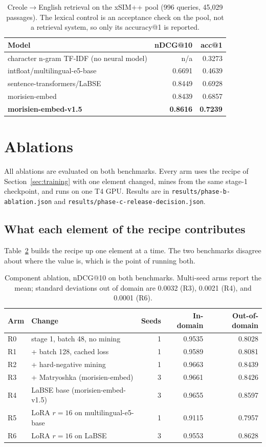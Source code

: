 \documentclass[11pt]{article}
\begin{document}
\begin{table}[h]
\centering
\small
\begin{tabular}{lrr}
\toprule
Model & nDCG@10 & acc@1 \\
\midrule
character n-gram TF-IDF (no neural model) & n/a & 0.3273 \\
intfloat/multilingual-e5-base & 0.6691 & 0.4639 \\
sentence-transformers/LaBSE & 0.8449 & 0.6928 \\
morisien-embed & 0.8439 & 0.6857 \\
\textbf{morisien-embed-v1.5} & \textbf{0.8616} & \textbf{0.7239} \\
\bottomrule
\end{tabular}
\caption{Creole$\rightarrow$English retrieval on the xSIM++ pool (996 queries, 45{,}029 passages).
The lexical control is an acceptance check on the pool, not a retrieval system, so only its
accuracy@1 is reported.}
\label{tab:ood}
\end{table}

\section{Ablations}

All ablations are evaluated on both benchmarks. Every arm uses the recipe of
Section~\ref{sec:training} with one element changed, mines from the same stage-1 checkpoint, and runs on
one T4 GPU. Results are in \texttt{results/phase-b-ablation.json} and
\texttt{results/phase-c-release-decision.json}.

\subsection{What each element of the recipe contributes}

Table~\ref{tab:ablation} builds the recipe up one element at a time. The two benchmarks disagree
about where the value is, which is the point of running both.

\begin{table}[h]
\centering
\small
\begin{tabular}{llrrr}
\toprule
Arm & Change & Seeds & In-domain & Out-of-domain \\
\midrule
R0 & stage 1, batch 48, no mining & 1 & 0.9535 & 0.8028 \\
R1 & + batch 128, cached loss & 1 & 0.9589 & 0.8081 \\
R2 & + hard-negative mining & 1 & 0.9663 & 0.8439 \\
R3 & + Matryoshka (morisien-embed) & 3 & 0.9661 & 0.8426 \\
R4 & LaBSE base (morisien-embed-v1.5) & 3 & 0.9655 & 0.8597 \\
R5 & LoRA $r{=}16$ on multilingual-e5-base & 1 & 0.9115 & 0.7957 \\
R6 & LoRA $r{=}16$ on LaBSE & 3 & 0.9553 & 0.8628 \\
\bottomrule
\end{tabular}
\caption{Component ablation, nDCG@10 on both benchmarks. Multi-seed arms report the mean; standard
deviations out of domain are 0.0032 (R3), 0.0021 (R4), and 0.0001 (R6).}
\label{tab:ablation}
\end{table}
\end{document}
